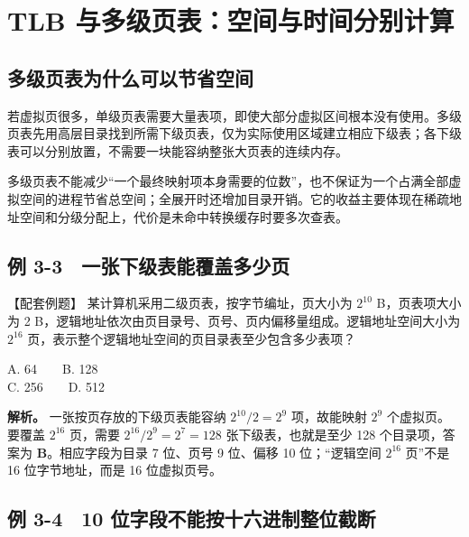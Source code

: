 \section{TLB 与多级页表：空间与时间分别计算}\label{OS03-5-5}

\subsection{多级页表为什么可以节省空间}\label{OS03-auto-1}

若虚拟页很多，单级页表需要大量表项，即使大部分虚拟区间根本没有使用。多级页表先用高层目录找到所需下级页表，仅为实际使用区域建立相应下级表；各下级表可以分别放置，不需要一块能容纳整张大页表的连续内存。

多级页表不能减少``一个最终映射项本身需要的位数''，也不保证为一个占满全部虚拟空间的进程节省总空间；全展开时还增加目录开销。它的收益主要体现在稀疏地址空间和分级分配上，代价是未命中转换缓存时要多次查表。

\subsection{例 3-3　一张下级表能覆盖多少页}\label{OS03-ex5-3}

\begin{example}[配套例题]

【配套例题】 某计算机采用二级页表，按字节编址，页大小为 \(2^{10}\) B，页表项大小为 2 B，逻辑地址依次由页目录号、页号、页内偏移量组成。逻辑地址空间大小为 \(2^{16}\) 页，表示整个逻辑地址空间的页目录表至少包含多少表项？

A. 64　　B. 128\\
C. 256　　D. 512

\end{example}

\textbf{解析。} 一张按页存放的下级页表能容纳 \(2^{10}/2=2^9\) 项，故能映射 \(2^9\) 个虚拟页。要覆盖 \(2^{16}\) 页，需要 \(2^{16}/2^9=2^7=128\) 张下级表，也就是至少 128 个目录项，答案为 \textbf{B}。相应字段为目录 7 位、页号 9 位、偏移 10 位；``逻辑空间 \(2^{16}\) 页''不是 16 位字节地址，而是 16 位虚拟页号。

\subsection{例 3-4　10 位字段不能按十六进制整位截断}\label{OS03-ex5-4}

